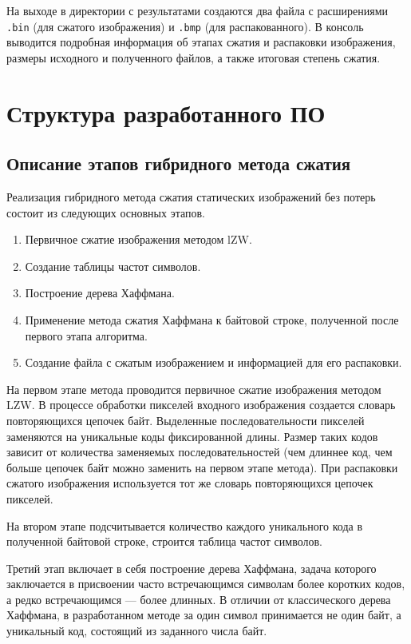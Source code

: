 На выходе в директории с результатами создаются два файла с расширениями \texttt{.bin} (для сжатого изображения) и \texttt{.bmp} (для распакованного). В консоль выводится подробная информация об этапах сжатия и распаковки изображения, размеры исходного и полученного файлов, а также итоговая степень сжатия.

\section{Структура разработанного ПО}

\subsection{Описание этапов гибридного метода сжатия}

Реализация гибридного метода сжатия статических изображений без потерь состоит из следующих основных этапов.
\begin{enumerate}
    \item Первичное сжатие изображения методом lZW.
    \item Создание таблицы частот символов.
    \item Построение дерева Хаффмана.
    \item Применение метода сжатия Хаффмана к байтовой строке, полученной после первого этапа алгоритма.
    \item Создание файла с сжатым изображением и информацией для его распаковки.
\end{enumerate}

На первом этапе метода проводится первичное сжатие изображения методом LZW. В процессе обработки пикселей входного изображения создается словарь повторяющихся цепочек байт. Выделенные последовательности пикселей заменяются на уникальные коды фиксированной длины. Размер таких кодов зависит от количества заменяемых последовательностей (чем длиннее код, чем больше цепочек байт можно заменить на первом этапе метода). При распаковки сжатого изображения используется тот же словарь повторяющихся цепочек пикселей.

На втором этапе подсчитывается количество каждого уникального кода в полученной байтовой строке, строится таблица частот символов.

Третий этап включает в себя построение дерева Хаффмана, задача которого заключается в присвоении часто встречающимся символам более коротких кодов, а редко встречающимся --- более длинных. В отличии от классического дерева Хаффмана, в разработанном методе за один символ принимается не один байт, а уникальный код, состоящий из заданного числа байт.

